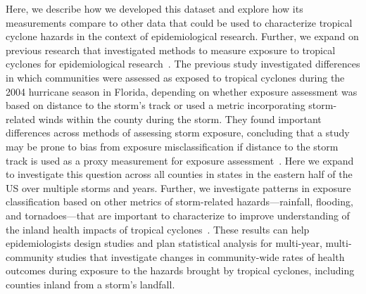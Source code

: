 Here, we describe how we developed this dataset and explore how its
measurements compare to other data that could be used to characterize tropical
cyclone hazards in the context of epidemiological research. Further, we expand
on previous research that investigated methods to measure exposure to tropical
cyclones for epidemiological research~\parencite{grabich2015measuring}.  The
previous study investigated differences in which communities were assessed as
exposed to tropical cyclones during the 2004 hurricane season in Florida,
depending on whether exposure assessment was based on distance to the storm's
track or used a metric incorporating storm-related winds within the county
during the storm.  They found important differences across methods of assessing
storm exposure, concluding that a study may be prone to bias from exposure
misclassification if distance to the storm track is used as a proxy measurement
for exposure assessment~\parencite{grabich2015measuring}.  Here we expand to
investigate this question across all counties in states in the eastern half of
the \ac{US} over multiple storms and years.  Further, we investigate patterns
in exposure classification based on other metrics of storm-related
hazards---rainfall, flooding, and tornadoes---that are important to
characterize to improve understanding of the inland health impacts of tropical
cyclones~\parencite{czajkowski2011, moore2012}. These results can help
epidemiologists design studies and plan statistical analysis for multi-year,
multi-community studies that investigate changes in community-wide rates of
health outcomes during exposure to the hazards brought by tropical cyclones,
including counties inland from a storm's landfall. 
